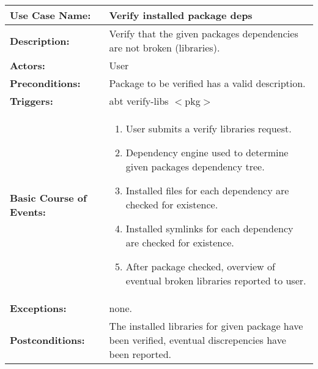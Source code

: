 
\begin{tabularx}{\linewidth}{|l|X|}
\hline
\textbf{Use Case Name:} & \textbf{Verify installed package deps} \\
\hline
\textbf{Description:} & 
Verify that the given packages dependencies are not broken (libraries).
\\
\hline
\textbf{Actors:} & User \\
\hline
\textbf{Preconditions:} & Package to be verified has a valid description. \\
\hline
\textbf{Triggers:} & abt verify-libs $<$pkg$>$ \\
\hline
\textbf{Basic Course of Events:} & 
\begin{minipage}{\linewidth} 
  \vspace{0.05em}
  \begin{enumerate}
    \item User submits a verify libraries request.
    \item Dependency engine used to determine given packages dependency tree.
    \item Installed files for each dependency are checked for existence.
    \item Installed symlinks for each dependency are checked for existence.
    \item After package checked, overview of eventual broken libraries reported to user.
  \end{enumerate}
  \vspace{0.05em}
\end{minipage}
\\
\hline 
\textbf{Exceptions:} & none. \\
\hline 
\textbf{Postconditions:} &
The installed libraries for given package have been verified, eventual discrepencies have been reported. \\
\hline
\end{tabularx}


